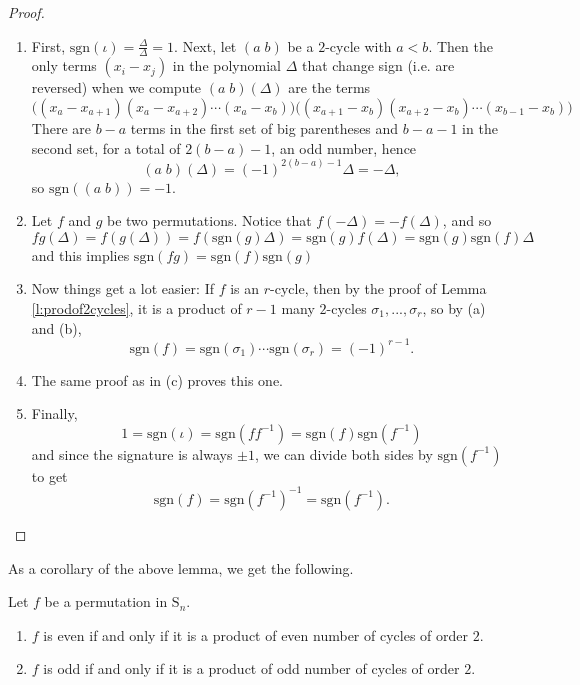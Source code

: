 \documentclass[11pt,dvipsnames]{book}
\numberwithin{equation}{section} %
\numberwithin{figure}{section} %
\numberwithin{table}{section} %
\begin{document}
\begin{proof}
\begin{enumerate}[label=(\alph*)]
\item First, $\mbox{sgn}(\iota)=\frac{\Delta}{\Delta}=1$. Next, let $(a\; b)$ be a $2$-cycle with $a<b$. Then the only terms $(x_{i}-x_{j})$ in the polynomial $\Delta$ that change sign (i.e. are reversed) when we compute $(a\; b)(\Delta)$ are the terms
\[
\Big((x_{a}-x_{a+1})(x_{a}-x_{a+2})\cdots (x_{a}-x_{b})\Big)
\Big((x_{a+1}-x_{b})(x_{a+2}-x_{b})\cdots (x_{b-1}-x_{b})\Big)
\]
There are $b-a$ terms in the first set of big parentheses and $b-a-1$ in the second set, for a total of $2(b-a)-1$, an odd number, hence 
\[
(a\; b)(\Delta) = (-1)^{2(b-a)-1} \Delta = -\Delta,
\]
so $\mbox{sgn}((a\; b))=-1$. 
\item Let $f$ and $g$ be two permutations. Notice that $f(-\Delta)=-f(\Delta)$, and so
\[
fg(\Delta)
=f(g(\Delta)) = f(\mbox{sgn}(g)\Delta) =  \mbox{sgn}(g) f(\Delta)
=\mbox{sgn}(g)\mbox{sgn}(f)\Delta
\]
and this implies $\mathrm{sgn}(fg)=\mathrm{sgn}(f)\mathrm{sgn}(g)$

\item Now things get a lot easier: If $f$ is an $r$-cycle, then by the proof of Lemma \ref{l:prodof2cycles}, it is a product of $r-1$ many $2$-cycles $\sigma_{1},...,\sigma_{r}$, so by (a) and (b),
\[
\mbox{sgn}(f) = \mbox{sgn}(\sigma_{1})\cdots  \mbox{sgn}(\sigma_{r})  =(-1)^{r-1}.\]
\item The same proof as in (c) proves this one. 
\item Finally, 
\[
1= \mbox{sgn}(\iota)  = \mbox{sgn}(ff^{-1})=\mbox{sgn}(f)\mbox{sgn}(f^{-1})
\]
and since the signature is always $\pm 1$, we can divide both sides by $\mbox{sgn}(f^{-1})$ to get 
\[
\mbox{sgn}(f)=\mbox{sgn}(f^{-1})^{-1} = \mbox{sgn}(f^{-1}).
\]
\end{enumerate}

\end{proof}

As a corollary of the above lemma, we get the following.

\begin{corollary}
Let $f$ be a permutation in $\mathrm{S}_n$.
\begin{enumerate}
\item $f$ is \textcolor[rgb]{0.98,0.00,0.00}{even} if and only if it is
a product of even number of cycles of order $2$.

\item $f$ is \textcolor[rgb]{0.98,0.00,0.00}{odd} if and only if it is a
product of odd number of cycles of order $2$.
\end{enumerate}
\end{corollary}
\end{document}
